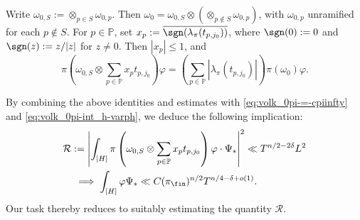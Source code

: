Write $\omega_{0,S} := \otimes_{p \in S} \omega_{0,p}$.  Then $\omega_0 = \omega_{0,S} \otimes (\otimes_{p \notin S} \omega_{0,p})$, with $\omega_{0,p}$ unramified for each $p \notin S$.  For $p \in \mathbb{P}$, set $x_p := \overline{\sgn(\lambda_\pi(t_{p,j_0}))}$, where $\sgn(0) := 0$ and $\sgn(z) := z/|z|$ for $z \neq 0$.  Then $|x_p| \leq 1$, and
\begin{equation*}
  \pi \left( \omega_{0,S} \otimes \sum_{p \in \mathbb{P} } x_p t_{p,j_0} \right) \varphi
  =
  \left( \sum_{p \in \mathbb{P} } |\lambda_\pi(t_{p,j_0}) | \right)
  \pi(\omega_0) \varphi.
\end{equation*}

By combining the above identities and estimates with \eqref{eq:volk_0pi-=-cpiinfty} and \eqref{eq:volk_0pi-int_h-varph}, we deduce the following implication:
\begin{align}
  &\mathcal{R} := \left\lvert
    \int_{[H]}
    \pi \left( \omega_{0,S} \otimes \sum_{p \in \mathbb{P} } x_p t_{p,j_0} \right) \varphi
    \cdot \Psi_{\ast}
    \right\rvert^2
    \ll
    T^{n/2 - 2 \delta } L^2 \label{eq:leftlvert-int-_h}
  \\
  &\quad \implies
    \int_{[H]} \varphi \Psi_{\ast} \ll
    C(\pi_{\fin})^{n/2}
    T^{n/4 - \delta + o(1)}. \nonumber
\end{align}
Our task thereby reduces to suitably estimating the quantity $\mathcal{R}$.

